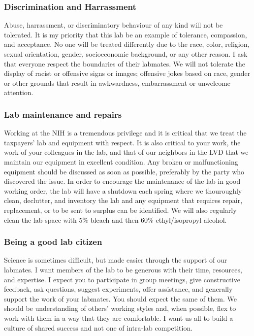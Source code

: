 \documentclass[10pt, letterpaper, twocolumn]{article} %
\begin{document}
\subsubsection{Discrimination and Harrassment}
Abuse, harrassment, or discriminatory behaviour of any kind will not be tolerated. It is my priority that this lab be an example of tolerance, compassion, and acceptance. No one will be treated differently due to the race, color, religion, sexual orientation, gender, socioeconomic background, or any other reason. I ask that everyone respect the boundaries of their labmates. We will not tolerate the display of racist or offensive signs or images; offensive jokes based on race, gender or other grounds that result in awkwardness, embarrassment or unwelcome attention.

\subsubsection{Lab maintenance and repairs}
Working at the NIH is a tremendous privilege and it is critical that we treat the taxpayers' lab and equipment with respect. It is also critical to your work, the work of your colleagues in the lab, and that of our neighbors in the LVD that we maintain our equipment in excellent condition. Any broken or malfunctioning equipment should be discussed as soon as possible, preferably by the party who discovered the issue.
In order to encourage the maintenance of the lab in good working order, the lab will have a shutdown each spring where we thouroughly clean, declutter, and inventory the lab and any equipment that requires repair, replacement, or to be sent to surplus can be identified. We will also regularly clean the lab space with 5\% bleach and then 60\% ethyl/isopropyl alcohol.

\subsubsection{Being a good lab citizen}
Science is sometimes difficult, but made easier through the support of our labmates. I want members of the lab to be generous with their time, resources, and expertise. I expect you to participate in group meetings, give constructive feedback, ask questions, suggest experiments, offer assistance, and generally support the work of your labmates. You should expect the same of them. We should be understanding of others' working styles and, when possible, flex to work with them in a way that they are comfortable. I want us all to build a culture of shared success and not one of intra-lab competition.
\end{document}
